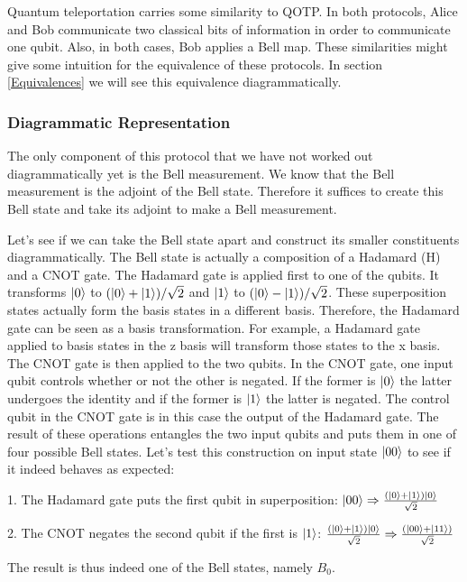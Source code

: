 \documentclass[]{article}
\begin{document}
Quantum teleportation carries some similarity to QOTP. In both protocols, Alice and Bob communicate two classical bits of information in order to communicate one qubit. Also, in both cases, Bob applies a Bell map. These similarities might give some intuition for the equivalence of these protocols. In section \ref{Equivalences} we will see this equivalence diagrammatically.

\subsubsection{Diagrammatic Representation}

The only component of this protocol that we have not worked out diagrammatically yet is the Bell measurement. We know that the Bell measurement is the adjoint of the Bell state. Therefore it suffices to create this Bell state and take its adjoint to make a Bell measurement.

Let's see if we can take the Bell state apart and construct its smaller constituents diagrammatically. The Bell state is actually a composition of a Hadamard (H) and a CNOT gate. The Hadamard gate is applied first to one of the qubits. It transforms $\ket{0}$ to  $(\ket{0} + \ket{1})/\sqrt{2}$ and $\ket{1}$ to $(\ket{0} - \ket{1})/\sqrt{2}$. These superposition states actually form the basis states in a different basis. Therefore, the Hadamard gate can be seen as a basis transformation. For example, a Hadamard gate applied to basis states in the z basis will transform those states to the x basis. The CNOT gate is then applied to the two qubits. In the CNOT gate, one input qubit controls whether or not the other is negated. If the former is $\ket{0}$ the latter undergoes the identity and if the former is $\ket{1}$ the latter is negated. The control qubit in the CNOT gate is in this case the output of the Hadamard gate. The result of these operations entangles the two input qubits and puts them in one of four possible Bell states. Let's test this construction on input state $\ket{00}$ to see if it indeed behaves as expected:

1. The Hadamard gate puts the first qubit in superposition: $\ket{00} \Rightarrow \frac{(\ket{0} + \ket{1})\ket{0}}{\sqrt{2}}$

2. The CNOT negates the second qubit if the first is $\ket{1}$: $\frac{(\ket{0} + \ket{1})\ket{0}}{\sqrt{2}} \Rightarrow \frac{(\ket{00} + \ket{11})}{\sqrt{2}}$

The result is thus indeed one of the Bell states, namely $B_0$.
\end{document}
